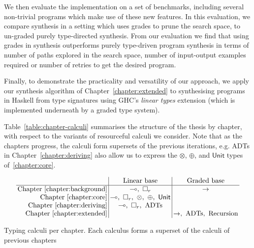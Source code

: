 \begin{enumerate}
        We then evaluate the implementation on a set of benchmarks, including
        several non-trivial programs which make use of these new features. In
        this evaluation, we compare synthesis in a setting which uses grades to
        prune the search space, to un-graded purely type-directed synthesis.
        From our evaluation we find that using grades in synthesis outperforms
        purely type-driven program synthesis in terms of number of paths
        explored in the search space, number of input-output examples required
        or number of retries to get the desired program.
        
        Finally, to demonstrate the practicality and versatility of our
        approach, we apply our synthesis algorithm of
        Chapter~\ref{chapter:extended} to synthesising programs in Haskell from
        type signatures using GHC's \emph{linear types} extension (which is
        implemented underneath by a graded type system).

\end{enumerate}

Table~\ref{table:chapter-calculi} summarises the structure of the thesis by
chapter, with respect to the variants of resourceful calculi we consider. Note
that as the chapters progress, the calculi form supersets of
the previous iterations, e.g. ADTs in Chapter~\ref{chapter:deriving} also allow
us to express the $\otimes$, $\oplus$, and $\mathsf{Unit}$ types
of~\ref{chapter:core}.
\begin{table}[H]
\begin{align*}
\setlength{\arraycolsep}{0.2em}
\begin{array}{r|c|c}
      & \text{ Linear base } & \text{ Graded base }\\
      \hline
      \text{Chapter~\ref{chapter:background}} & \multimap,\ \Box_r & \rightarrow \\
      \text{Chapter~\ref{chapter:core}} & \multimap,\ \Box_r,\ \otimes,\ \oplus,\ \mathsf{Unit} &  \\
      \text{Chapter~\ref{chapter:deriving}} & \multimap,\ \Box_r,\ \text{ADTs} & \\
      \text{Chapter~\ref{chapter:extended}} & & \rightarrow,\ \text{ADTs},\ \text{Recursion}
\end{array}
\end{align*}
\caption{Typing calculi per chapter. Each calculus forms a superset of the calculi of previous chapters}
\label{table:chapter-calculi}
\end{table}

